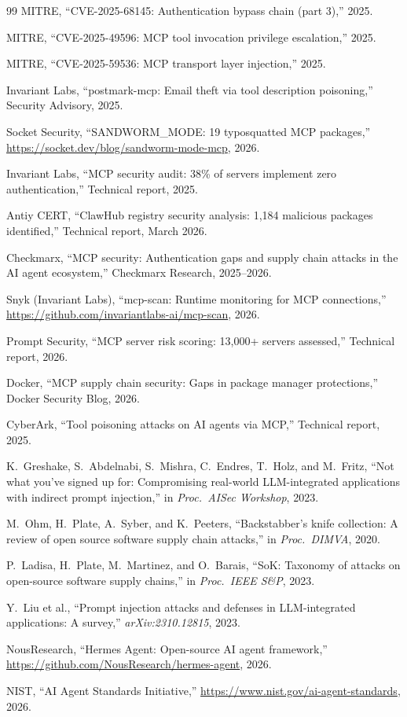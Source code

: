 \documentclass[letterpaper,twocolumn,10pt]{article}
\begin{document}
\begin{thebibliography}{99}
MITRE,
``CVE-2025-68145: Authentication bypass chain (part 3),'' 2025.

MITRE,
``CVE-2025-49596: MCP tool invocation privilege escalation,'' 2025.

MITRE,
``CVE-2025-59536: MCP transport layer injection,'' 2025.

Invariant Labs,
``postmark-mcp: Email theft via tool description poisoning,''
Security Advisory, 2025.

Socket Security,
``SANDWORM\_MODE: 19 typosquatted MCP packages,''
\url{https://socket.dev/blog/sandworm-mode-mcp}, 2026.

Invariant Labs,
``MCP security audit: 38\% of servers implement zero authentication,''
Technical report, 2025.

Antiy CERT,
``ClawHub registry security analysis: 1,184 malicious packages identified,''
Technical report, March 2026.

Checkmarx,
``MCP security: Authentication gaps and supply chain attacks in the AI agent ecosystem,''
Checkmarx Research, 2025--2026.

Snyk (Invariant Labs),
``mcp-scan: Runtime monitoring for MCP connections,''
\url{https://github.com/invariantlabs-ai/mcp-scan}, 2026.

Prompt Security,
``MCP server risk scoring: 13,000+ servers assessed,''
Technical report, 2026.

Docker,
``MCP supply chain security: Gaps in package manager protections,''
Docker Security Blog, 2026.

CyberArk,
``Tool poisoning attacks on AI agents via MCP,''
Technical report, 2025.

K.~Greshake, S.~Abdelnabi, S.~Mishra, C.~Endres, T.~Holz, and M.~Fritz,
``Not what you've signed up for: Compromising real-world LLM-integrated
applications with indirect prompt injection,''
in \emph{Proc.\ AISec Workshop}, 2023.

M.~Ohm, H.~Plate, A.~Syber, and K.~Peeters,
``Backstabber's knife collection: A review of open source software supply chain attacks,''
in \emph{Proc.\ DIMVA}, 2020.

P.~Ladisa, H.~Plate, M.~Martinez, and O.~Barais,
``SoK: Taxonomy of attacks on open-source software supply chains,''
in \emph{Proc.\ IEEE S\&P}, 2023.

Y.~Liu et al.,
``Prompt injection attacks and defenses in LLM-integrated applications: A survey,''
\emph{arXiv:2310.12815}, 2023.

NousResearch,
``Hermes Agent: Open-source AI agent framework,''
\url{https://github.com/NousResearch/hermes-agent}, 2026.

NIST,
``AI Agent Standards Initiative,''
\url{https://www.nist.gov/ai-agent-standards}, 2026.

\end{thebibliography}
\end{document}
